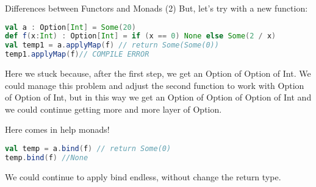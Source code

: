 \begin{frame}[fragile]{Differences between Functors and Monads (2)}
	But, let's try with a new function:
\begin{lstlisting}[language=scala]
val a : Option[Int] = Some(20)		
def f(x:Int) : Option[Int] = if (x == 0) None else Some(2 / x)
val temp1 = a.applyMap(f) // return Some(Some(0))
temp1.applyMap(f)// COMPILE ERROR
\end{lstlisting}	
	Here we stuck because, after the first step, we get an Option of Option of Int. 
	We could manage this problem and adjust the second function	to work with Option of Option of Int, 
	but in this way we get an Option of Option of Option of Int and we could continue getting more and more layer of Option.
	
	\pause
	
	Here comes in help monads!
\begin{lstlisting}[language=scala]
val temp = a.bind(f) // return Some(0)
temp.bind(f) //None
\end{lstlisting}	
	We could continue to apply bind endless, without change the return type.
\end{frame}
